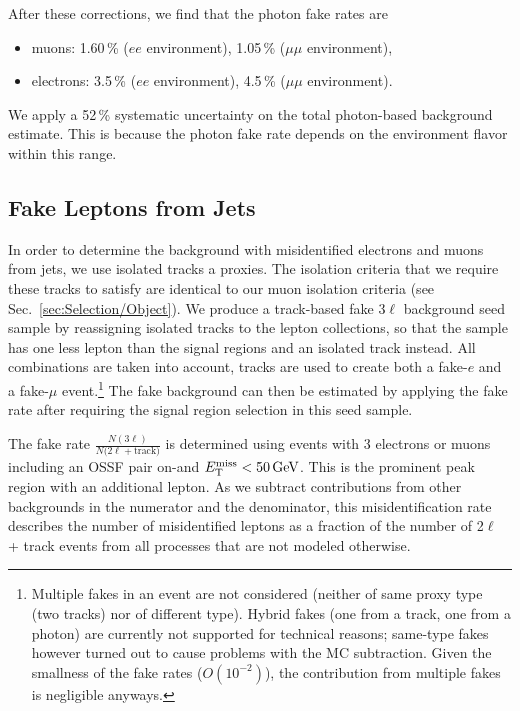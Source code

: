 After these corrections, we find that the photon fake rates are
\begin{itemize}
	\item muons: 1.60\,\% ($ee$ environment), 1.05\,\% ($\mu\mu$ environment),
	\item electrons: 3.5\,\% ($ee$ environment), 4.5\,\% ($\mu\mu$ environment).
\end{itemize}

We apply a 52\,\% systematic uncertainty on the total photon-based background estimate. This is because the photon fake rate depends on the environment flavor within this range.


\subsection{Fake Leptons from Jets}
In order to determine the background with misidentified electrons and muons from jets, we use isolated tracks a proxies. The isolation criteria that we require these tracks to satisfy are identical to our muon isolation criteria (see Sec.~\ref{sec:Selection/Object}). We produce a track-based fake 3$\ell$ background seed sample by reassigning isolated tracks to the lepton collections, so that the sample has one less lepton than the signal regions and an isolated track instead. All combinations are taken into account, \ie tracks are used to create both a fake-$e$ and a fake-$\mu$ event.\footnote{Multiple fakes in an event are not considered (neither of same proxy type (\eg two tracks) nor of different type). Hybrid fakes (one from a track, one from a photon) are currently not supported for technical reasons; same-type fakes however turned out to cause problems with the \ttbar MC subtraction. Given the smallness of the fake rates ($O(10^{-2})$), the contribution from multiple fakes is negligible anyways.} The fake background can then be estimated by applying the fake rate after requiring the signal region selection in this seed sample.

The fake rate $\frac{N(3\ell)}{N(2\ell + \textrm{track)}}$ is determined using events with 3 electrons or muons including an OSSF pair on-\Z and $E_{\mathrm{T}}^{\text{miss}} < 50\,\text{Ge\hspace{-.08em}V}$. This is the prominent \Z peak region with an additional lepton. As we subtract contributions from other backgrounds in the numerator and the denominator, this misidentification rate describes the number of misidentified leptons as a fraction of the number of 2$\ell$ + track events from all processes that are not modeled otherwise.

